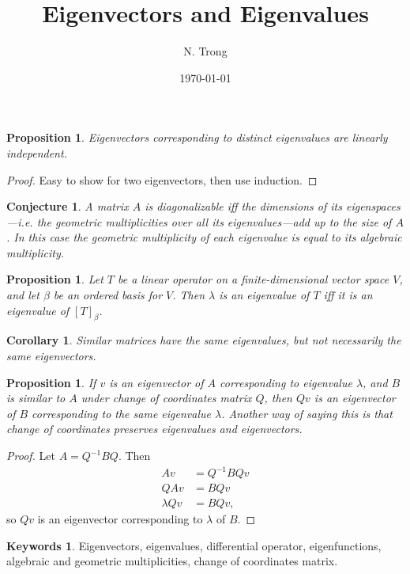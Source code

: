 \documentclass[11pt]{article}
\title{Eigenvectors and Eigenvalues}
\author{N. Trong}
\date{\today}                                           %
\theoremstyle{plain}
\newtheorem{cor}[thm]{Corollary}
\newtheorem{prop}[thm]{Proposition}
\newtheorem{conj}[thm]{Conjecture}
\theoremstyle{definition}
\newtheorem*{keywords}{Keywords}
\theoremstyle{remark}
\begin{document}
\maketitle

\begin{prop}
Eigenvectors corresponding to distinct eigenvalues are linearly independent.
\end{prop}

\begin{proof}
Easy to show for two eigenvectors, then use induction.
\end{proof}

\begin{conj}
A matrix $A$ is diagonalizable iff the dimensions of its eigenspaces---i.e. the geometric multiplicities over all its eigenvalues---add up to the size of $A$. In this case the geometric multiplicity of each eigenvalue is equal to its algebraic multiplicity.
\end{conj}

\begin{prop}
Let $T$ be a linear operator on a finite-dimensional vector space $V$, and let $\beta$ be an ordered basis for $V$. Then $\lambda$ is an eigenvalue of $T$ iff it is an eigenvalue of $[T]_\beta$.
\end{prop}

\begin{cor}
Similar matrices have the same eigenvalues, but not necessarily the same eigenvectors.
\end{cor}

\begin{prop}
If $v$ is an eigenvector of $A$ corresponding to eigenvalue $\lambda$, and $B$ is similar to $A$ under change of coordinates matrix $Q$, then $Qv$ is an eigenvector of $B$ corresponding to the same eigenvalue $\lambda$.  Another way of saying this is that change of coordinates preserves eigenvalues and eigenvectors.
\end{prop}

\begin{proof}
Let $A = Q^{-1}BQ$. Then
\begin{align*}
Av &= Q^{-1}BQv \\
QAv &= BQv \\
\lambda Qv &= BQv,
\end{align*}
so $Qv$ is an eigenvector corresponding to $\lambda$ of $B$.
\end{proof}

\begin{keywords}
Eigenvectors, eigenvalues, differential operator, eigenfunctions, algebraic and geometric multiplicities, change of coordinates matrix.
\end{keywords}
\end{document}
